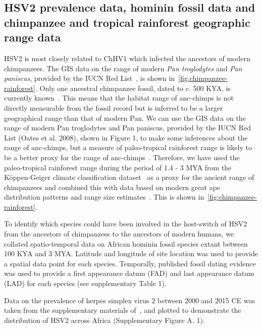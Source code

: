 \documentclass[fleqn,10pt]{wlscirep}
\begin{document}
\subsection*{HSV2 prevalence data, hominin fossil data and chimpanzee and tropical rainforest geographic range data}

HSV2 is most closely related to ChHV1 which infected the ancestors of modern chimpanzees. The GIS data on the range of modern \textit{Pan troglodytes} and \textit{Pan paniscus},  provided by the IUCN Red List~\citep{Oates2008}, is shown in~\cref{fig:chimpanzee-rainforest}.  Only one ancestral chimpanzee fossil, dated to c. 500 KYA, is currently known~\citep{McBrearty2005}. This means that the habitat range of anc-chimps is not directly measurable from the fossil record but is inferred to be a larger geographical range than that of modern Pan. We can use the GIS data on the range of modern Pan troglodytes and Pan paniscus, provided by the IUCN Red List (Oates et al. 2008), shown in Figure 1, to make some inferences about the range of anc-chimps, but a measure of paleo-tropical rainforest range is likely to be a better proxy for the range of anc-chimps~\cite{Elton2008}. Therefore, we have used the paleo-tropical rainforest range during the period of 1.4 - 3 MYA from the K\"{o}ppen-Geiger climate classification dataset~\cite{Peel2007} as a proxy for the ancient range of chimpanzees and combined this with data based on modern great ape distribution patterns and range size estimates~\citep{MyersThompson2003}. This is shown in~\cref{fig:chimpanzee-rainforest}. 


To identify which species could have been involved in the host-switch of HSV2 from the ancestors of chimpanzees to the ancestors of modern humans, we collated spatio-temporal data on African hominin fossil species extant between 100 KYA and 3 MYA. Latitude and longitude of site location was used to provide a spatial data point for each species. Temporally, published fossil dating evidence was used to provide a first appearance datum (FAD) and last appearance datum (LAD) for each species (see supplementary Table 1).

Data on the prevalence of herpes simplex virus 2 between 2000 and 2015 CE was taken from the supplementary materials of~\citep{Looker2015}, and plotted to demonstrate the distribution of HSV2 across Africa (Supplementary Figure A. 1). 
\end{document}
